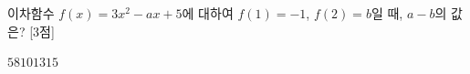 이차함수 $f(x)=3x^2-ax+5$에 대하여 $f(1)=-1$, $f(2)=b$일 때, $a-b$의 값은?  \mbox{[3점]}
\begin{choices32}{$5$}{$8$}{$10$}{$13$}{$15$}\end{choices32}
